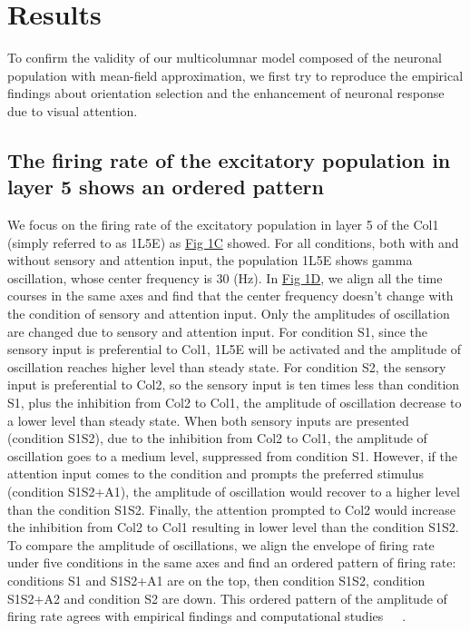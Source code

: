 \documentclass[10pt,letterpaper]{article}
\begin{document}
\section*{Results}
To confirm the validity of our multicolumnar model composed of the neuronal population with mean-field approximation, we first try to reproduce the empirical findings about orientation selection and the enhancement of neuronal response due to visual attention.
\subsection*{The firing rate of the excitatory population in layer 5 shows an ordered pattern}
We focus on the firing rate of the excitatory population in layer 5 of the Col1 (simply referred to as 1L5E) as \hyperlink{fig:fig1}{Fig 1C} showed. For all conditions, both with and without sensory and attention input, the population 1L5E shows gamma oscillation, whose center frequency is 30 (Hz). In \hyperlink{fig:fig1}{Fig 1D}, we align all the time courses in the same axes and find that the center frequency doesn't change with the condition of sensory and attention input. Only the amplitudes of oscillation are changed due to sensory and attention input. For condition S1, since the sensory input is preferential to Col1, 1L5E will be activated and the amplitude of oscillation reaches higher level than steady state. For condition S2, the sensory input is preferential to Col2, so the sensory input is ten times less than condition S1, plus the inhibition from Col2 to Col1, the amplitude of oscillation decrease to a lower level than steady state. When both sensory inputs are presented (condition S1S2), due to the inhibition from Col2 to Col1, the amplitude of oscillation goes to a medium level, suppressed from condition S1. However, if the attention input comes to the condition and prompts the preferred stimulus (condition S1S2+A1), the amplitude of oscillation would recover to a higher level than the condition S1S2. Finally, the attention prompted to Col2 would increase the inhibition from Col2 to Col1 resulting in lower level than the condition S1S2. To compare the amplitude of oscillations, we align the envelope of firing rate under five conditions in the same axes and find an ordered pattern of firing rate: conditions S1 and S1S2+A1 are on the top, then condition S1S2, condition S1S2+A2 and condition S2 are down. This ordered pattern of the amplitude of firing rate agrees with empirical findings and computational studies~\cite{luck1997}~\cite{reynolds1999}~\cite{wagatsuma2011}.
\end{document}
